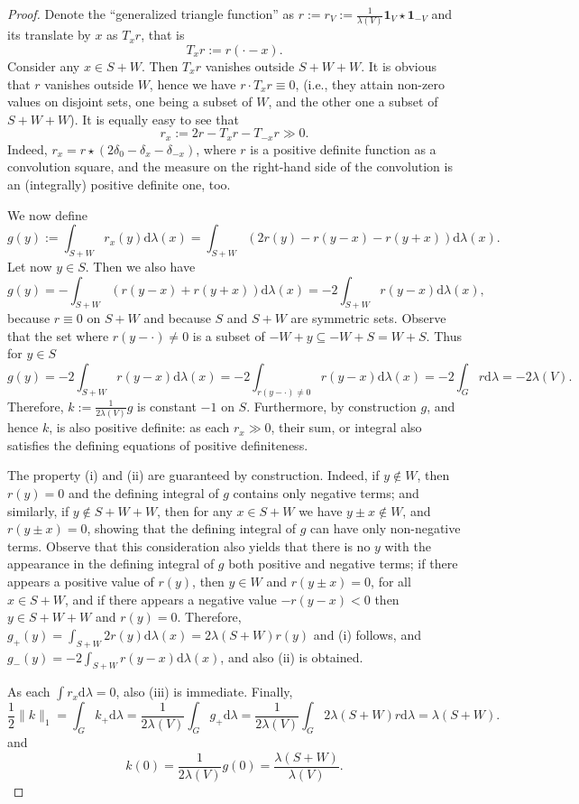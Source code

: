 \documentclass[10pt,a4paper]{amsart}
\def\car{\mathbf{1}}
\def\dd{\mathrm{d}}
\def\haar{\lambda}
\begin{document}
\begin{proof} Denote the ``generalized triangle function'' as $r:=r_V:=\frac{1}{\lambda(V)} \car_V \star \car_{-V}$ and its translate by $x$ as $T_xr$, that is
\[
T_xr:=r(\cdot-x).
\]
Consider any $x \in S+ W$. Then $T_xr$ vanishes outside $S+W+W$. It is obvious that $r$ vanishes outside $W$, hence we have $r \cdot T_xr\equiv 0$, (i.e., they attain non-zero values on disjoint sets, one being a subset of $W$, and the other one a subset of $S+W+W$). It is equally easy to see that
\[
r_x := 2r-T_x r - T_{-x} r \gg 0.
\]
Indeed, $r_x = r \star (2\delta_0-\delta_x-\delta_{-x})$, where $r$ is a positive definite function as a convolution square, and the measure on the right-hand side of the convolution is an (integrally) positive definite one, too.

We now define
\[
g(y):=\int_{S+W} r_x(y) \dd \lambda(x) = \int_{S+W} (2r(y)-r(y-x)-r(y+x)) \dd\lambda(x).
\]
Let now $y \in S$. Then we also have
\[
g(y) = - \int_{S+W} (r(y-x) +r(y+x)) \dd \lambda(x) = - 2 \int_{S+W} r(y-x) \dd \lambda(x),
\]
because $r \equiv 0$ on $S+W$ and because $S$ and $S+W$ are symmetric sets. Observe that the set where $r(y-\cdot) \ne 0$ is a subset of $-W + y \subseteq  -W+S = W+S$. Thus for $y \in S$
\[
g(y)=- 2 \int_{S+W} r( y-x) \dd \lambda(x) = -2 \int_{r(y-\cdot)\ne 0} r( y-x)\dd \lambda(x) = -2 \int_G r\dd\haar = -2 \lambda(V).
\]
Therefore, $k:=\frac{1}{2\lambda(V)} g$ is constant $-1$ on $S$. Furthermore, by construction $g$, and hence $k$, is also positive definite: as each $r_x \gg 0$, their sum, or integral also satisfies the defining equations of positive definiteness.

The property (i) and (ii) are guaranteed by construction. Indeed, if $y \not\in W$, then $r(y)=0$ and the defining integral of $g$ contains only negative terms; and similarly, if $y \not\in S+W+W$, then for any $x \in S+W$ we have $y \pm x \not\in W$, and $r(y \pm x) =0$, showing that the defining integral of $g$ can have only non-negative terms. Observe that this consideration also yields that there is no $y$ with the appearance in the defining integral of $g$ both positive and negative terms; if there appears a positive value of $r(y)$, then $y \in W$ and $r(y \pm x)= 0$, for all $x \in S+W$, and if there appears a negative value $-r(y-x)<0$ then $y \in S+W+W$ and $r(y)=0$. Therefore, $g_{+}(y)=\int_{S+W} 2r(y) \dd \lambda(x) = 2 \lambda(S+W) r(y)$ and (i) follows, and $g_{-}(y)=-2 \int_{S+W} r(y-x) \dd \lambda(x)$, and also (ii) is obtained.

As each $\int r_x\dd\haar =0$, also (iii) is immediate. Finally,
\[
\frac12 \|k\|_1 = \int_G k_{+} \dd\haar= \frac{1}{2\lambda(V)} \int_G g_{+}\dd\haar = \frac{1}{2\lambda(V)} \int_G 2 \lambda(S+W) r\dd\haar = \lambda(S+W) .
\]
and
\[
k(0) = \frac{1}{2\lambda(V)} g(0) = \frac{\lambda(S+W)}{\lambda(V)}.
\]
\end{proof}
\end{document}
